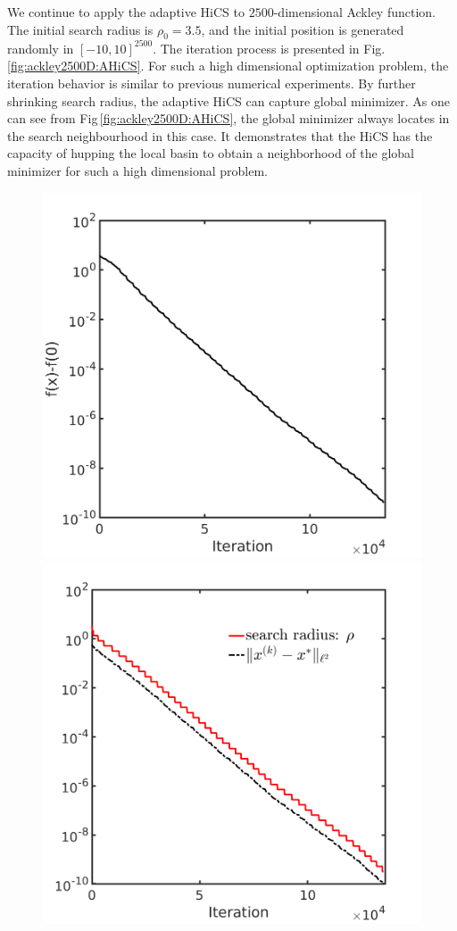\documentclass[mathpazo]{csam}
\theoremstyle{remark}
\newcommand{\Note}[1]{{\color{blue}{#1}}} %
\begin{document}
We continue to apply the adaptive HiCS to $2500$-dimensional
Ackley function. The initial search radius is $\rho_0=3.5$, and
the initial position is generated randomly in $[-10,10]^{2500}$. 
The iteration process is presented in Fig.\,\ref{fig:ackley2500D:AHiCS}. 
For such a high dimensional optimization problem, the iteration
behavior is similar to previous numerical experiments. 
\Note{
When $\rho=3.5$, the HiCS costs $90$ steps to achieve convergence.}
By further shrinking search radius, the adaptive HiCS can
capture global minimizer. As one can see from 
Fig\,\ref{fig:ackley2500D:AHiCS}, the global minimizer always
locates in the search neighbourhood in this case. 
It demonstrates that the HiCS has the capacity of hupping the
local basin to obtain a neighborhood of the global minimizer for such a high
dimensional problem.
\begin{figure}[!htbp] 
	\centering
	\includegraphics[scale=0.25]{../figures/ackley2500D.png}
	\includegraphics[scale=0.25]{../figures/ackley2500D_dist.png}

\end{figure}
\end{document}
